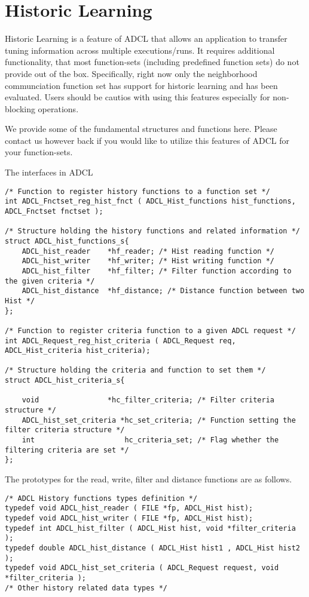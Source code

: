 \section{Historic Learning}

Historic Learning is a feature of ADCL that allows an application to transfer tuning
information across multiple executions/runs. It requires additional
functionality, that most function-sets (including predefined function sets) do
not provide out of the box. Specifically, right now only the neighborhood
communciation function set has support for historic learning and has been
evaluated. Users should be cautios with using this features especially for
non-blocking operations. 

We provide some of the fundamental structures and functions here. Please
contact us however back if you would like to utilize this features of ADCL for
your function-sets.

The interfaces in ADCL 
\begin{verbatim}
/* Function to register history functions to a function set */
int ADCL_Fnctset_reg_hist_fnct ( ADCL_Hist_functions hist_functions,
ADCL_Fnctset fnctset );

/* Structure holding the history functions and related information */
struct ADCL_hist_functions_s{
    ADCL_hist_reader    *hf_reader; /* Hist reading function */
    ADCL_hist_writer    *hf_writer; /* Hist writing function */
    ADCL_hist_filter    *hf_filter; /* Filter function according to the given criteria */
    ADCL_hist_distance  *hf_distance; /* Distance function between two Hist */
};

/* Function to register criteria function to a given ADCL request */
int ADCL_Request_reg_hist_criteria ( ADCL_Request req, ADCL_Hist_criteria hist_criteria);

/* Structure holding the criteria and function to set them */
struct ADCL_hist_criteria_s{

    void                *hc_filter_criteria; /* Filter criteria structure */
    ADCL_hist_set_criteria *hc_set_criteria; /* Function setting the filter criteria structure */
    int                     hc_criteria_set; /* Flag whether the filtering criteria are set */
};
\end{verbatim}

The prototypes for the read, write, filter and distance functions are as follows.
\begin{verbatim}
/* ADCL History functions types definition */
typedef void ADCL_hist_reader ( FILE *fp, ADCL_Hist hist);
typedef void ADCL_hist_writer ( FILE *fp, ADCL_Hist hist);
typedef int ADCL_hist_filter ( ADCL_Hist hist, void *filter_criteria );
typedef double ADCL_hist_distance ( ADCL_Hist hist1 , ADCL_Hist hist2 );
typedef void ADCL_hist_set_criteria ( ADCL_Request request, void *filter_criteria );
/* Other history related data types */
\end{verbatim}
